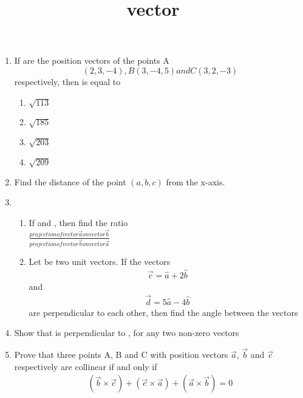 \documentclass{article}
\title{vector}
\begin{document}
\begin{enumerate}
	\item If  are the position vectors of the points A$$(2,3,-4), B(3,-4,5) and C(3,2,-3)$$ respectively, then  is equal to
\begin{enumerate}[label=(\Alph*)]
\item $\sqrt{113}$
\item $\sqrt{185}$
\item $\sqrt{203}$
\item $\sqrt{209}$
\end{enumerate}
\item Find the distance of the point $(a, b, c)$ from the x-axis.
\item \begin{enumerate} %
		\item If  and , then find the ratio
	\\ $\frac{projection of vector \vec{a} on vector \vec{b}}{projection of vector \vec{b} on vector \vec{a}}$
\item Let  be two unit vectors. If the vectors 
	\begin{align}
		\text{$\vec{c} = \hat{a} + 2\hat{b}$}
	\end{align}
		and 
		\begin{align}
			\text{$\vec{d} = 5\hat{a} - 4\hat{b}$} 
		\end{align}
		are perpendicular to each other, then find the angle between the vectors  
\end{enumerate}
\item Show that  is perpendicular to , for any two non-zero vectors 
\item Prove that three points A, B and C with position vectors $\vec{a}$, $\vec{b}$ and $\vec{c}$ respectively are collinear if and only if 
	\begin{align}
		(\vec{b} \times \vec{c}) + (\vec{c} \times \vec{a}) + (\vec{a} \times \vec{b}) = 0
	\end{align}
\end{enumerate}
\end{document}
